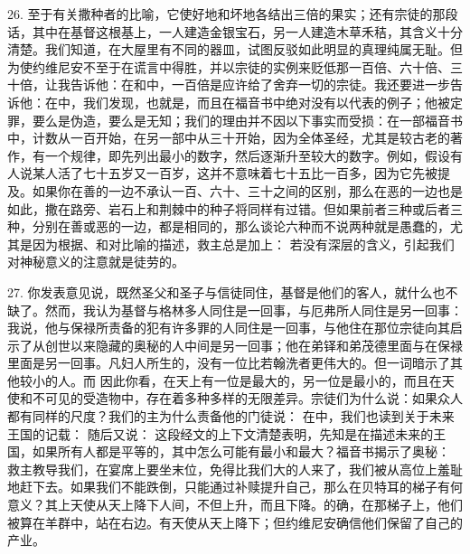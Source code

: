 26. 至于有关撒种者的比喻，它使好地和坏地各结出三倍的果实；还有宗徒的那段话，其中在基督这根基上，一人建造金银宝石，另一人建造木草禾秸，其含义十分清楚。我们知道，在大屋里有不同的器皿，试图反驳如此明显的真理纯属无耻。但为使约维尼安不至于在谎言中得胜，并以宗徒的实例来贬低那一百倍、六十倍、三十倍，让我告诉他：在和中，一百倍是应许给了舍弃一切的宗徒。我还要进一步告诉他：在中，我们发现，也就是，而且在福音书中绝对没有以代表的例子；他被定罪，要么是伪造，要么是无知；我们的理由并不因以下事实而受损：在一部福音书中，计数从一百开始，在另一部中从三十开始，因为全体圣经，尤其是较古老的著作，有一个规律，即先列出最小的数字，然后逐渐升至较大的数字。例如，假设有人说某人活了七十五岁又一百岁，这并不意味着七十五比一百多，因为它先被提及。如果你在善的一边不承认一百、六十、三十之间的区别，那么在恶的一边也是如此，撒在路旁、岩石上和荆棘中的种子将同样有过错。但如果前者三种或后者三种，分别在善或恶的一边，都是相同的，那么谈论六种而不说两种就是愚蠢的，尤其是因为根据、和对比喻的描述，救主总是加上： 若没有深层的含义，引起我们对神秘意义的注意就是徒劳的。\par

27. 你发表意见说，既然圣父和圣子与信徒同住，基督是他们的客人，就什么也不缺了。然而，我认为基督与格林多人同住是一回事，与厄弗所人同住是另一回事：我说，他与保禄所责备的犯有许多罪的人同住是一回事，与他住在那位宗徒向其启示了从创世以来隐藏的奥秘的人中间是另一回事；他在弟铎和弟茂德里面与在保禄里面是另一回事。凡妇人所生的，没有一位比若翰洗者更伟大的。但一词暗示了其他较小的人。而 因此你看，在天上有一位是最大的，另一位是最小的，而且在天使和不可见的受造物中，存在着多种多样的无限差异。宗徒们为什么说：如果众人都有同样的尺度？我们的主为什么责备他的门徒说： 在中，我们也读到关于未来王国的记载： 随后又说： 这段经文的上下文清楚表明，先知是在描述未来的王国，如果所有人都是平等的，其中怎么可能有最小和最大？福音书揭示了奥秘： 救主教导我们，在宴席上要坐末位，免得比我们大的人来了，我们被从高位上羞耻地赶下去。如果我们不能跌倒，只能通过补赎提升自己，那么在贝特耳的梯子有何意义？其上天使从天上降下人间，不但上升，而且下降。的确，在那梯子上，他们被算在羊群中，站在右边。有天使从天上降下；但约维尼安确信他们保留了自己的产业。\par

